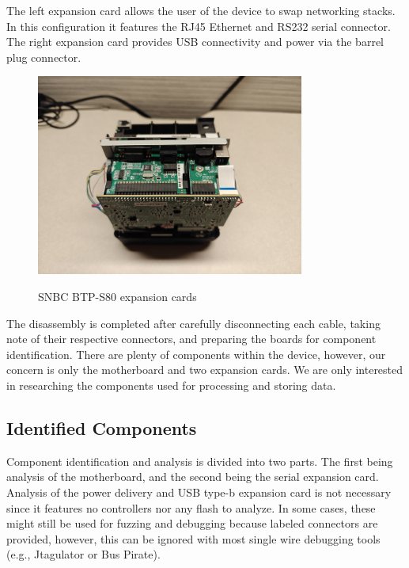 The left expansion card allows the user of the device to swap networking stacks. In this configuration it features the RJ45 Ethernet and RS232 serial connector. The right expansion card provides USB connectivity and power via the barrel plug connector. 

\begin{figure}[ht]
    \centering
    {\includegraphics[width=88mm,scale=0.5]
    {Figures/Teardown/IMG20231204171002.jpg}}
    \caption{SNBC BTP-S80 expansion cards}
    \label{fig:snbc_btp_s80_expansion}
\end{figure}

The disassembly is completed after carefully disconnecting each cable, taking note of their respective connectors, and preparing the boards for component identification. There are plenty of components within the device, however, our concern is only the motherboard and two expansion cards. We are only interested in researching the components used for processing and storing data.


\subsection{Identified Components} \label{identifiedcomponents}



Component identification and analysis is divided into two parts. The first being analysis of the motherboard, and the second being the serial expansion card. Analysis of the power delivery and USB type-b expansion card is not necessary since it features no controllers nor any flash to analyze. In some cases, these might still be used for fuzzing and debugging because labeled connectors are provided, however, this can be ignored with most single wire debugging tools (e.g., Jtagulator or Bus Pirate).


